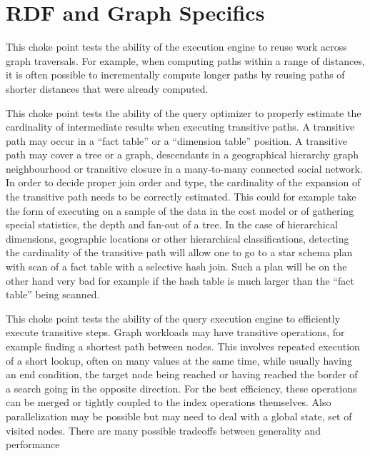 \section{RDF and Graph Specifics}



This choke point tests the ability of the execution engine to reuse work across
graph traversals. For example, when computing paths within a range of distances,
it is often possible to incrementally compute longer paths by reusing paths of
shorter distances that were already computed.





This choke point tests the ability of the query optimizer to properly estimate the cardinality of intermediate results when executing transitive paths. A transitive path may occur in a ``fact table'' or a ``dimension table'' position.
A transitive path may cover a tree or a graph, \eg descendants in a geographical hierarchy \vs graph neighbourhood or transitive closure in a many-to-many connected social network.
In order to decide proper join order and type, the cardinality of the expansion of the transitive path needs to be correctly estimated.
This could for example take the form of executing on a sample of the data in the
cost model or of gathering special statistics, \eg the depth and fan-out of a tree. In the case of hierarchical dimensions,
\eg geographic locations or other hierarchical classifications, detecting the cardinality of the transitive path will allow one to go to a star schema plan with scan of a fact table with a selective hash join.
Such a plan will be on the other hand very bad for example if the hash table is much larger than the ``fact table'' being scanned.





This choke point tests the ability of the query execution engine to efficiently execute transitive steps. Graph workloads may have transitive operations, for example finding a shortest path between nodes.
This involves repeated execution of a short lookup, often on many values at the
same time, while usually having an end condition, \eg the target node being reached or having reached the border of a search going in the opposite direction.
For the best efficiency, these operations can be merged or tightly coupled to
the index operations themselves. Also parallelization may be possible but may
need to deal with a global state, \eg set of visited nodes.
There are many possible tradeoffs between generality and performance

